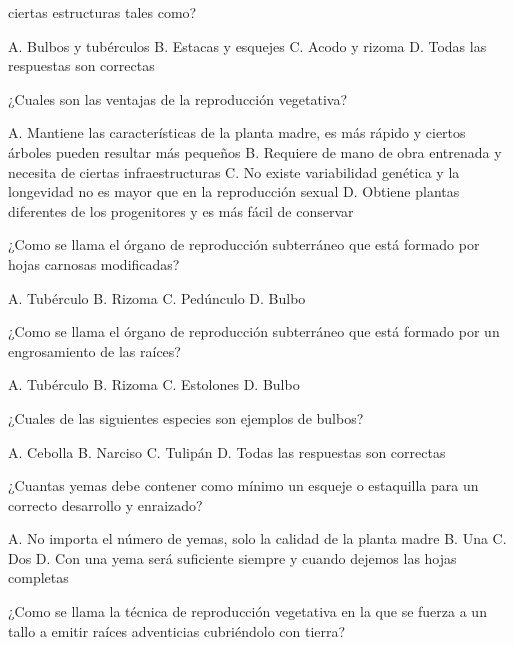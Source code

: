 \documentclass[11pt]{exam}
\begin{document}
{\begin{questions}
  ciertas estructuras tales como?
  \begin{checkboxes}
    \CorrectChoice A. Bulbos y tubérculos
    \choice B. Estacas y esquejes
    \choice C. Acodo y rizoma
    \choice D. Todas las respuestas son correctas 
  \end{checkboxes}
\question ¿Cuales son las ventajas de la reproducción vegetativa?
  \begin{checkboxes}
    \CorrectChoice A. Mantiene las características de la planta madre, es más
    rápido y ciertos árboles pueden resultar más pequeños
    \choice B. Requiere de mano de obra entrenada y necesita de ciertas
    infraestructuras
    \choice C. No existe variabilidad genética y la longevidad no es mayor que
    en la reproducción sexual
    \choice D. Obtiene plantas diferentes de los progenitores y es más fácil de
    conservar 
  \end{checkboxes}
\question ¿Como se llama el órgano de reproducción subterráneo que está
  formado por hojas carnosas modificadas?
  \begin{checkboxes}
    \choice A. Tubérculo
    \choice B. Rizoma
    \choice C. Pedúnculo
    \CorrectChoice D. Bulbo
  \end{checkboxes}
\question ¿Como se llama el órgano de reproducción subterráneo que está formado
  por un engrosamiento de las raíces?
  \begin{checkboxes}
    \CorrectChoice A. Tubérculo
    \choice B. Rizoma
    \choice C. Estolones
    \choice D. Bulbo    
  \end{checkboxes}
\question ¿Cuales de las siguientes especies son ejemplos de bulbos?
  \begin{checkboxes}
    \choice A. Cebolla
    \choice B. Narciso
    \choice C. Tulipán
    \CorrectChoice D. Todas las respuestas son correctas 
  \end{checkboxes}
  \newpage
\question ¿Cuantas yemas debe contener como mínimo un esqueje o estaquilla para un correcto
  desarrollo y enraizado?
  \begin{checkboxes}
    \choice A. No importa el número de yemas, solo la calidad de la planta madre
    \choice B. Una
    \CorrectChoice C. Dos
    \choice D. Con una yema será suficiente siempre y cuando dejemos las hojas completas
  \end{checkboxes}
\question ¿Como se llama la técnica de reproducción vegetativa en la que se
  fuerza a un tallo a emitir raíces adventicias cubriéndolo con tierra?
  \begin{checkboxes}

\end{checkboxes}
\end{questions}}
\end{document}
